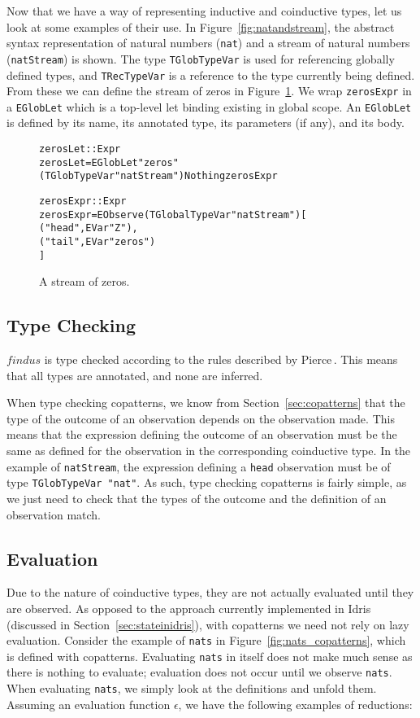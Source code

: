 Now that we have a way of representing inductive and coinductive types, let us look at some examples of their use. In Figure~\ref{fig:natandstream}, the abstract syntax representation of natural numbers (\texttt{nat}) and a stream of natural numbers (\texttt{natStream}) is shown. The type \texttt{TGlobTypeVar} is used for referencing globally defined types, and \texttt{TRecTypeVar} is a reference to the type currently being defined. From these we can define the stream of zeros in Figure~\ref{fig:astzeros}. We wrap \texttt{zerosExpr} in a \texttt{EGlobLet} which is a top-level let binding existing in global scope. An \texttt{EGlobLet} is defined by its name, its annotated type, its parameters (if any), and its body.

\begin{figure}
\begin{alltt}
zerosLet :: Expr
zerosLet = EGlobLet "zeros" (TGlobTypeVar "natStream") Nothing zerosExpr

zerosExpr :: Expr
zerosExpr = EObserve (TGlobalTypeVar "natStream") [
            ("head", EVar "Z"),
            ("tail", EVar "zeros")
        ]
\end{alltt}
\caption{A stream of zeros.}
\label{fig:astzeros}
\end{figure}

\subsection{Type Checking}
$findus$ is type checked according to the rules described by Pierce\,\cite{Pierce:2002:TPL:509043}. This means that all types are annotated, and none are inferred.

When type checking copatterns, we know from Section~\ref{sec:copatterns} that the type of the outcome of an observation depends on the observation made. This means that the expression defining the outcome of an observation must be the same as defined for the observation in the corresponding coinductive type. In the example of \texttt{natStream}, the expression defining a \texttt{head} observation must be of type \texttt{TGlobTypeVar "nat"}. As such, type checking copatterns is fairly simple, as we just need to check that the types of the outcome and the definition of an observation match.

\subsection{Evaluation}
Due to the nature of coinductive types, they are not actually evaluated until they are observed. As opposed to the approach currently implemented in Idris (discussed in Section~\ref{sec:stateinidris}), with copatterns we need not rely on lazy evaluation. Consider the example of \texttt{nats} in Figure~\ref{fig:nats_copatterns}, which is defined with copatterns. Evaluating \texttt{nats} in itself does not make much sense as there is nothing to evaluate; evaluation does not occur until we observe \texttt{nats}. When evaluating \texttt{nats}, we simply look at the definitions and unfold them. Assuming an evaluation function $\epsilon$, we have the following examples of reductions:

